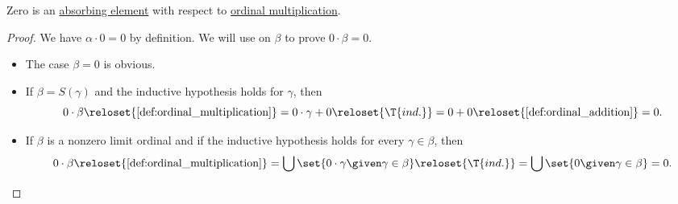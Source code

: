 \begin{lemma}\label{thm:ordinal_multiplication_zero_absorbing}
  Zero is an \hyperref[def:semigroup_absorbing_element]{absorbing element} with respect to \hyperref[def:ordinal_multiplication]{ordinal multiplication}.
\end{lemma}
\begin{proof}
  We have \( \alpha \cdot 0 = 0 \) by definition. We will use  on \( \beta \) to prove \( 0 \cdot \beta = 0 \).
  \begin{itemize}
    \item The case \( \beta = 0 \) is obvious.
    \item If \( \beta = S(\gamma) \) and the inductive hypothesis holds for \( \gamma \), then
    \begin{equation*}
      0 \cdot \beta
        \reloset {\ref{def:ordinal_multiplication}} =
        0 \cdot \gamma + 0
        \reloset {\T{ind.}} =
        0 + 0
        \reloset {\ref{def:ordinal_addition}} =
        0.
      \end{equation*}
    \item If \( \beta \) is a nonzero limit ordinal and if the inductive hypothesis holds for every \( \gamma \in \beta \), then
    \begin{equation*}
      0 \cdot \beta
        \reloset {\ref{def:ordinal_multiplication}} =
        \bigcup\set{ 0 \cdot \gamma \given \gamma \in \beta }
        \reloset {\T{ind.}} =
        \bigcup\set{ 0 \given \gamma \in \beta }
        =
        0.
      \end{equation*}
  \end{itemize}
\end{proof}

